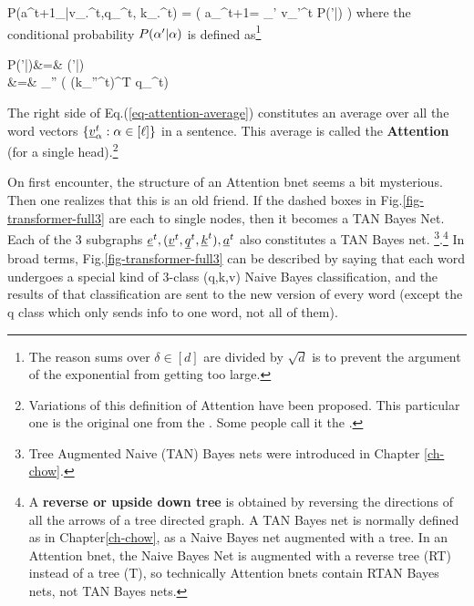 \beq\color{blue}
P(a^{t+1}_\alp|v_.^t,q_\alp^t,
 k_.^t)
=
\indi(\;\;\;
a_\alp^{t+1}=
\sum_{{\alp'}\in[\ell]}
v_{\alp'}^t
P({\alp'}|\alp)
\;\;)
\label{eq-attention-average}
\eeq
where the conditional
probability
$P({\alpha'}|\alpha)$ is
defined as\footnote{
The reason sums over
$\delta\in[d]$ are divided by
$\sqrt{d}$ is to
prevent the argument of
the exponential from getting too
large.
}

\beqa
P({\alp'}|\alp)&=&
\softmax{}(\alp'|\alp)
\\
&=&
{\sum_{\alp''\in [\ell]}
\exp\left(
(k_{\alp''}^t)^T q_\alp^t\right)}
\eeqa

The right side of Eq.(\ref{eq-attention-average})
constitutes an average over
all the word vectors $\{\rvv_\alp^t: \alp\in[\ell]\}$
in a sentence.
This average is called the {\bf Attention}
(for a single head).\footnote{Variations
of this definition of Attention
have been proposed. This particular one
is the original
one from the . Some people
call it the .}

\beq
{}
\eeq



On first encounter, the structure of an Attention bnet
seems a bit mysterious. Then one realizes that this is
an old friend.
If the dashed  boxes in
Fig.\ref{fig-transformer-full3} are each  to single nodes,
then it becomes a TAN Bayes Net. Each of the 3 subgraphs $\rve^t, (\rvv^t, \rvq^t, \rvk^t), \rva^t $
also constitutes a TAN Bayes net. \footnote{Tree Augmented Naive (TAN) Bayes nets
were introduced in Chapter \ref{ch-chow}.}.\footnote{A {\bf reverse or upside down tree} is obtained by reversing the directions of all the arrows of a tree directed graph. A TAN Bayes net is normally defined as in Chapter\ref{ch-chow}, as a Naive Bayes net augmented with a tree. In an Attention bnet, the Naive Bayes Net is augmented with a reverse tree (RT) instead of a tree (T), so technically Attention bnets contain RTAN Bayes nets, not TAN Bayes nets. }
In broad terms, Fig.\ref{fig-transformer-full3}
can be described by saying that
each word undergoes a special
kind of 3-class (q,k,v) Naive Bayes
classification,
and the results of that classification
are sent to the new version of every word (except the q class which only sends
info to one word, not all of them).


